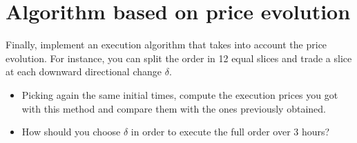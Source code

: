 \section{Algorithm based on price evolution}

Finally, implement an execution algorithm that takes into account the price evolution. For instance, you can split the order in 12 equal slices and trade a slice at each downward directional change $\delta$. 

\begin{itemize}
    \item Picking again the same initial times, compute the execution prices you got with this method and compare them with the ones previously obtained. 
    \item How should you choose $\delta$ in order to execute the full order over 3 hours?
\end{itemize}